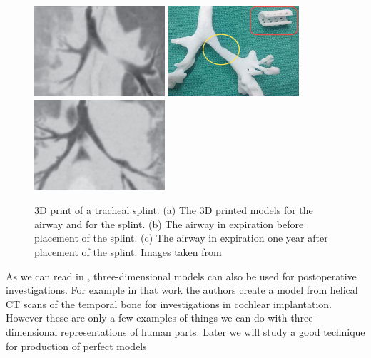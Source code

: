 \begin{figure}[htb] %
   \centering
   \includegraphics[width=0.33\linewidth]{images/TrachealSplint0.png}\hfill
   \includegraphics[width=0.33\linewidth]{images/TrachealSplint1.png}\hfill
   \includegraphics[width=0.33\linewidth]{images/TrachealSplint2.png}
   \caption[3D print of a tracheal splint]{3D print of a tracheal splint. (a) The 3D printed models for the airway and for the splint. (b) The airway in expiration before placement of the splint. (c) The airway in expiration one year after placement of the splint. Images taken from~\cite{Zopf}}
   \label{fig:TrachealSplint}
\end{figure}

As we can read in \cite{Himi}, three-dimensional models can also be used for postoperative investigations. For example in that work the authors create a model from helical CT scans of the temporal bone for investigations in cochlear implantation.\\

However these are only a few examples of things we can do with three-dimensional representations of human parts. Later we will study a good technique for production of perfect models
